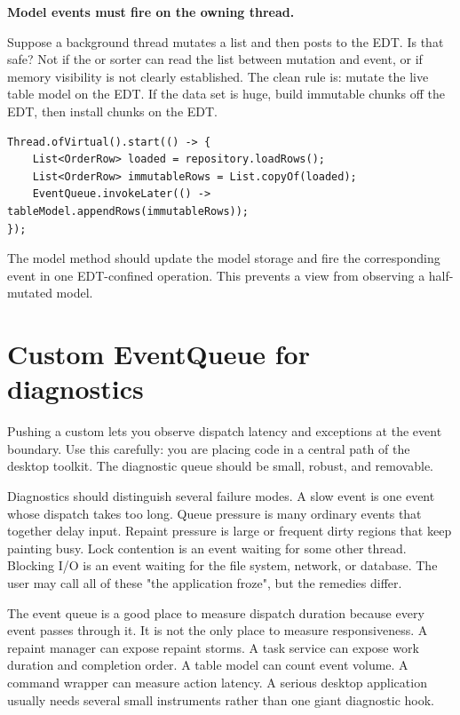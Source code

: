 \textbf{Model events must fire on the owning thread.}

Suppose a background thread mutates a list and then posts  to the EDT. Is that safe? Not if the  or sorter can read the list between mutation and event, or if memory visibility is not clearly established. The clean rule is: mutate the live table model on the EDT. If the data set is huge, build immutable chunks off the EDT, then install chunks on the EDT.

\begin{lstlisting}[caption={Build rows off the EDT, install rows on the EDT.}]
Thread.ofVirtual().start(() -> {
    List<OrderRow> loaded = repository.loadRows();
    List<OrderRow> immutableRows = List.copyOf(loaded);
    EventQueue.invokeLater(() -> tableModel.appendRows(immutableRows));
});
\end{lstlisting}

The model method  should update the model storage and fire the corresponding event in one EDT-confined operation. This prevents a view from observing a half-mutated model.

\section{Custom EventQueue for diagnostics}

Pushing a custom  lets you observe dispatch latency and exceptions at the event boundary. Use this carefully: you are placing code in a central path of the desktop toolkit. The diagnostic queue should be small, robust, and removable.

Diagnostics should distinguish several failure modes. A slow event is one event whose dispatch takes too long. Queue pressure is many ordinary events that together delay input. Repaint pressure is large or frequent dirty regions that keep painting busy. Lock contention is an event waiting for some other thread. Blocking I/O is an event waiting for the file system, network, or database. The user may call all of these "the application froze", but the remedies differ.

The event queue is a good place to measure dispatch duration because every event passes through it. It is not the only place to measure responsiveness. A repaint manager can expose repaint storms. A task service can expose work duration and completion order. A table model can count event volume. A command wrapper can measure action latency. A serious desktop application usually needs several small instruments rather than one giant diagnostic hook.

